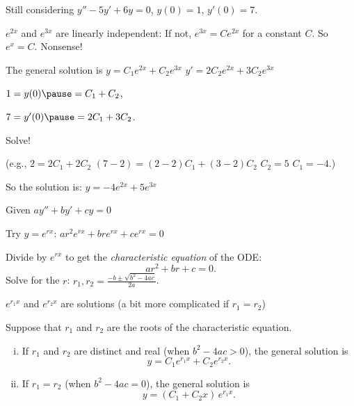 \documentclass[10pt,aspectratio=169]{beamer}
\begin{document}
\begin{frame}
Still considering
\qquad $y''-5y'+6y = 0$, \qquad $y(0) = 1$, \qquad $y'(0) = 7$.

\medskip

$e^{2x}$ and $e^{3x}$ are linearly independent:
\pause
If not, $e^{3x} = C e^{2x}$ for a constant $C$.
\pause
So $e^x = C$.
\pause
Nonsense!

\medskip
\pause

The general solution is \quad $y = C_1 e^{2x} + C_2 e^{3x}$
\pause
\qquad
$y' = 2 C_2 e^{2x} + 3 C_2 e^{3x}$

\medskip
\pause

$1 = y(0) \pause = C_1 + C_2$,

\medskip
\pause

$7 = y'(0) \pause = 2 C_1 + 3 C_2$.

\medskip
\pause

Solve!

\pause
(e.g., $2 = 2C_1 + 2C_2$
\pause\wthus
$(7-2) = (2-2)C_1 + (3-2)C_2$
\pause
\wthus
$C_2 = 5$
\wthus
\pause
$C_1 = -4$.)

\medskip
\pause

So the solution is: \quad
$y = -4 e^{2x} + 5 e^{3x}$

\end{frame}

\begin{frame}
Given
\quad
$a y'' + b y' + c y = 0$

\medskip
\pause

Try $y = e^{rx}$:
\quad
$a r^2 e^{rx} + 
b r e^{rx} + 
c e^{rx} = 0$

\medskip
\pause
Divide by $e^{rx}$ to get the
\emph{characteristic equation} of the ODE:
\[
a r^2 + 
b r + 
c = 0 .
\]
\pause
Solve for the $r$:
\qquad 
$r_1, r_2 = \frac{-b \pm \sqrt{b^2 - 4ac}}{2a}$.

\medskip
\pause

\wthus $e^{r_1 x}$ and $e^{r_2 x}$ are solutions (a bit more complicated if
$r_1=r_2$)

\pause
\begin{theorem}
Suppose that $r_1$ and $r_2$ are the roots of the characteristic equation.
\begin{enumerate}[(i)]
\item\pause
If $r_1$ and $r_2$ are distinct and real (when $b^2 - 4ac > 0$),
the general solution is
\[
y = C_1 e^{r_1 x} + C_2 e^{r_2 x} .
\]
\item
\pause
If $r_1 = r_2$ (when $b^2 - 4ac = 0$), 
the general solution is
\[
y = (C_1 + C_2 x)\, e^{r_1 x} .
\]
\end{enumerate}
\end{theorem}
\end{frame}
\end{document}
